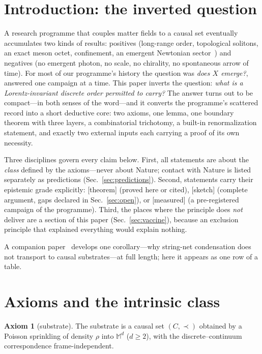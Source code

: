 \documentclass[aps,prd,reprint,nofootinbib,superscriptaddress,floatfix]{revtex4-2}
\theoremstyle{definition}
\newtheorem{axiom}{Axiom}
\begin{document}
\maketitle

\section{Introduction: the inverted question}
\label{sec:intro}

A research programme that couples matter fields to a causal set eventually accumulates
two kinds of results: positives (long-range order, topological solitons, an exact meson
octet, confinement, an emergent Newtonian sector~\cite{MatterGravityPRD,SU3PRD}) and
negatives (no emergent photon, no scale, no chirality, no spontaneous arrow of time).
For most of our programme's history the question was \emph{does $X$ emerge?}, answered
one campaign at a time. This paper inverts the question: \emph{what is a
Lorentz-invariant discrete order permitted to carry?} The answer turns out to be
compact---in both senses of the word---and it converts the programme's scattered record
into a short deductive core: two axioms, one lemma, one boundary theorem with three
layers, a combinatorial trichotomy, a built-in renormalization statement, and exactly
two external inputs each carrying a proof of its own necessity.

Three disciplines govern every claim below. First, all statements are about the
\emph{class} defined by the axioms---never about Nature; contact with Nature is listed
separately as predictions (Sec.~\ref{sec:predictions}). Second, statements carry their
epistemic grade explicitly: [theorem] (proved here or cited), [sketch] (complete
argument, gaps declared in Sec.~\ref{sec:open}), or [measured] (a pre-registered
campaign of the programme). Third, the places where the principle does \emph{not}
deliver are a section of this paper (Sec.~\ref{sec:vaccine}), because an exclusion
principle that explained everything would explain nothing.

A companion paper~\cite{WenComplement} develops one corollary---why string-net
condensation does not transport to causal substrates---at full length; here it appears
as one row of a table.

\section{Axioms and the intrinsic class}
\label{sec:axioms}

\begin{axiom}[substrate]
The substrate is a causal set $(C,\prec)$ obtained by a Poisson sprinkling of density
$\rho$ into $\mathbb{M}^d$ ($d\ge2$), with the discrete--continuum correspondence
frame-independent.
\end{axiom}
\end{document}
